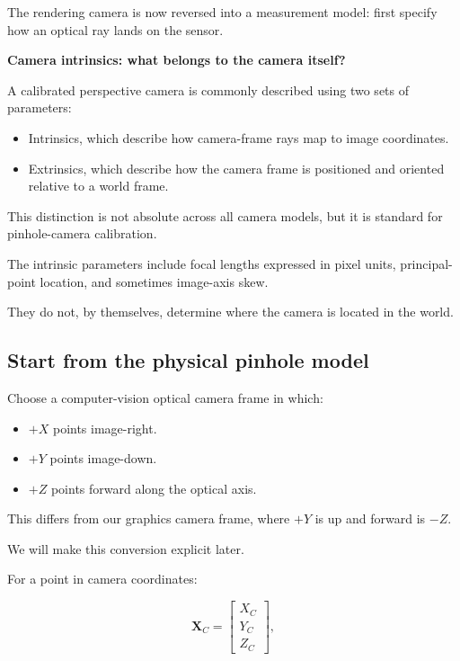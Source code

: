 The rendering camera is now reversed into a measurement model: first specify how an optical ray lands on the sensor.

\textbf{Camera intrinsics: what belongs to the camera itself?}

A calibrated perspective camera is commonly described using two sets of parameters:

\begin{itemize}
\tightlist
\item
  Intrinsics, which describe how camera-frame rays map to image coordinates.
\item
  Extrinsics, which describe how the camera frame is positioned and oriented relative to a world frame.
\end{itemize}

This distinction is not absolute across all camera models, but it is standard for pinhole-camera calibration.

The intrinsic parameters include focal lengths expressed in pixel units, principal-point location, and sometimes image-axis skew.

They do not, by themselves, determine where the camera is located in the world.

\subsection{Start from the physical pinhole model}\label{02-foundations-ii-ch034-start-from-the-physical-pinhole-model}

\hypertarget{02-foundations-ii-ch034-start-from-the-physical-pinhole-model}{}

Choose a computer-vision optical camera frame in which:

\begin{itemize}
\tightlist
\item
  \(+X\) points image-right.
\item
  \(+Y\) points image-down.
\item
  \(+Z\) points forward along the optical axis.
\end{itemize}

This differs from our graphics camera frame, where \(+Y\) is up and forward is \(-Z\).

We will make this conversion explicit later.

For a point in camera coordinates:

\[
 \mathbf X_C= \begin{bmatrix} X_C\\Y_C\\Z_C \end{bmatrix},
\]

